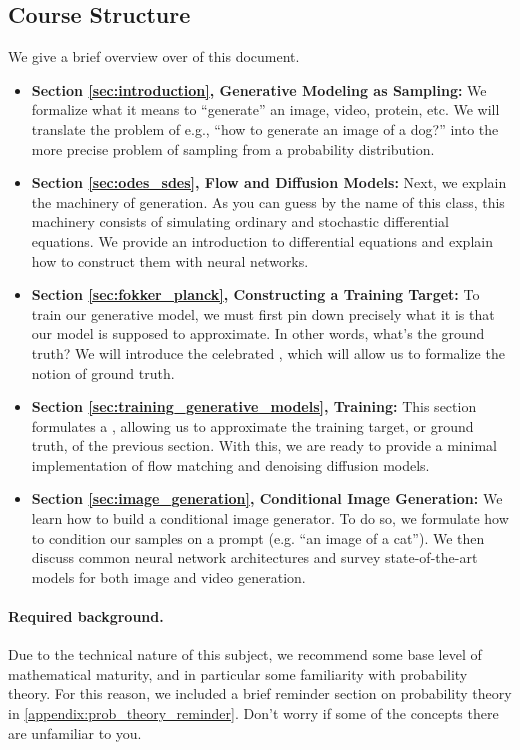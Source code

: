 \subsection{Course Structure}

We give a brief overview over of this document.
\begin{itemize}
\item \textbf{\sffamily Section \ref{sec:introduction}, Generative Modeling as Sampling:} We formalize what it means to ``generate'' an image, video, protein, etc. We will translate the problem of e.g., ``how to generate an image of a dog?'' into the more precise problem of sampling from a probability distribution.
\item \textbf{\sffamily Section \ref{sec:odes_sdes}, Flow and Diffusion Models:} Next, we explain the machinery of generation. As you can guess by the name of this class, this machinery consists of simulating ordinary and stochastic differential equations. We provide an introduction to differential equations and explain how to construct them with neural networks. 
\item \textbf{\sffamily Section \ref{sec:fokker_planck}, Constructing a Training Target:} To train our generative model, we must first pin down precisely what it is that our model is supposed to approximate. In other words, what's the ground truth? We will introduce the celebrated , which will allow us to formalize the notion of ground truth.
\item \textbf{\sffamily Section \ref{sec:training_generative_models}, Training:} This section formulates a , allowing us to approximate the training target, or ground truth, of the previous section. With this, we are ready to provide a minimal implementation of flow matching and denoising diffusion models.
\item \textbf{\sffamily Section \ref{sec:image_generation}, Conditional Image Generation:} We learn how to build a conditional image generator. To do so, we formulate how to condition our samples on a prompt (e.g. ``an image of a cat''). We then discuss common neural network architectures and survey state-of-the-art models for both image and video generation.
\end{itemize}

\paragraph{Required background.} Due to the technical nature of this subject, we recommend some base level of mathematical maturity, and in particular some familiarity with probability theory. For this reason, we included a brief reminder section on probability theory in \cref{appendix:prob_theory_reminder}. Don't worry if some of the concepts there are unfamiliar to you.

